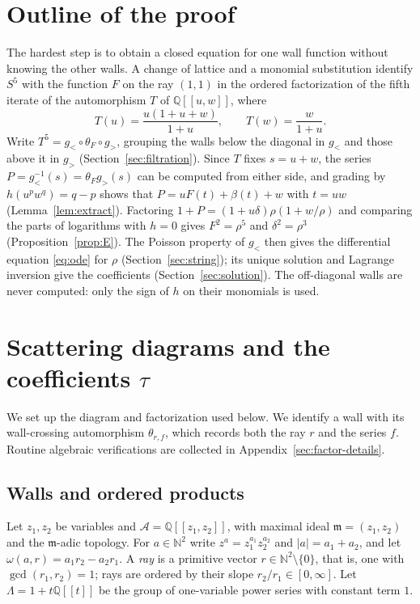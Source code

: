 \documentclass[11pt]{article}
\theoremstyle{definition}
\theoremstyle{remark}
\numberwithin{equation}{section}
\newcommand{\Q}{\mathbb{Q}}
\newcommand{\N}{\mathbb{N}}
\newcommand{\ps}[1]{\Q[\![#1]\!]}
\newcommand{\m}{\mathfrak{m}}
\newcommand{\gl}{g_{<}}
\newcommand{\gr}{g_{>}}
\begin{document}
\section{Outline of the proof}\label{sec:overview}
The hardest step is to obtain a closed equation for one wall function
without knowing the other walls. A change of lattice and a monomial
substitution identify $S^5$ with the function $F$ on the ray $(1,1)$ in
the ordered factorization of the fifth iterate of the automorphism $T$ of
$\ps{u,w}$, where
\[
T(u)=\frac{u(1+u+w)}{1+u},\qquad T(w)=\frac{w}{1+u}.
\]
Write $T^5=\gl\circ\theta_F\circ\gr$, grouping the walls below the
diagonal in $\gl$ and those above it in $\gr$ (Section~\ref{sec:filtration}).
Since $T$ fixes $s=u+w$, the series $P=\gl^{-1}(s)=\theta_F\gr(s)$ can be
computed from either side, and grading by $h(u^pw^q)=q-p$ shows that
$P=uF(t)+\beta(t)+w$ with $t=uw$ (Lemma~\ref{lem:extract}). Factoring
$1+P=(1+u\delta)\rho(1+w/\rho)$ and comparing the parts of logarithms
with $h=0$ gives $F^2=\rho^5$ and $\delta^2=\rho^3$
(Proposition~\ref{prop:E}). The Poisson property of $\gl$ then gives the
differential equation \eqref{eq:ode} for $\rho$ (Section~\ref{sec:string});
its unique solution and Lagrange inversion give the coefficients
(Section~\ref{sec:solution}). The off-diagonal walls are never computed:
only the sign of $h$ on their monomials is used.

\section{Scattering diagrams and the coefficients \texorpdfstring{$\tau$}{tau}}\label{sec:defs}

We set up the diagram and factorization used below. We identify a wall
with its wall-crossing automorphism $\theta_{r,f}$, which records both
the ray $r$ and the series $f$. Routine algebraic verifications are
collected in Appendix~\ref{sec:factor-details}.

\subsection{Walls and ordered products}
Let $z_1,z_2$ be variables and $\mathcal{A}=\ps{z_1,z_2}$, with maximal
ideal $\m=(z_1,z_2)$ and the $\m$-adic topology. For $a\in\N^2$ write
$z^a=z_1^{a_1}z_2^{a_2}$ and $|a|=a_1+a_2$, and let
$\omega(a,r)=a_1r_2-a_2r_1$. A \emph{ray} is a primitive vector
$r\in\N^2\setminus\{0\}$, that is, one with $\gcd(r_1,r_2)=1$; rays are
ordered by their slope $r_2/r_1\in[0,\infty]$. Let
$\Lambda=1+t\ps{t}$ be the group of one-variable power series with
constant term $1$.
\end{document}
